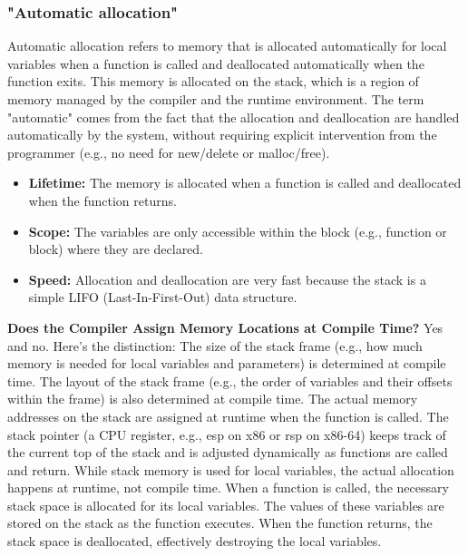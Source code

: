 \documentclass{report}
\begin{document}
 \bigbreak \noindent 
 \subsubsection{"Automatic allocation"}
 \bigbreak \noindent 
 Automatic allocation refers to memory that is allocated automatically for local variables when a function is called and deallocated automatically when the function exits.
 \bigbreak \noindent 
 This memory is allocated on the stack, which is a region of memory managed by the compiler and the runtime environment.
 \bigbreak \noindent 
 The term "automatic" comes from the fact that the allocation and deallocation are handled automatically by the system, without requiring explicit intervention from the programmer (e.g., no need for new/delete or malloc/free).
 \begin{itemize}
     \item \textbf{Lifetime:} The memory is allocated when a function is called and deallocated when the function returns.
     \item \textbf{Scope:} The variables are only accessible within the block (e.g., function or {} block) where they are declared.
     \item \textbf{Speed:} Allocation and deallocation are very fast because the stack is a simple LIFO (Last-In-First-Out) data structure.
 \end{itemize}
 \bigbreak \noindent 
 \textbf{Does the Compiler Assign Memory Locations at Compile Time?} Yes and no. Here’s the distinction:
 \bigbreak \noindent 
 The size of the stack frame (e.g., how much memory is needed for local variables and parameters) is determined at compile time. The layout of the stack frame (e.g., the order of variables and their offsets within the frame) is also determined at compile time.
 \bigbreak \noindent 
 The actual memory addresses on the stack are assigned at runtime when the function is called.
 \bigbreak \noindent 
 The stack pointer (a CPU register, e.g., esp on x86 or rsp on x86-64) keeps track of the current top of the stack and is adjusted dynamically as functions are called and return.
 \bigbreak \noindent 
 While stack memory is used for local variables, the actual allocation happens at runtime, not compile time.
 \bigbreak \noindent 
 When a function is called, the necessary stack space is allocated for its local variables.
 \bigbreak \noindent 
 The values of these variables are stored on the stack as the function executes.
 \bigbreak \noindent 
 When the function returns, the stack space is deallocated, effectively destroying the local variables.
\end{document}
